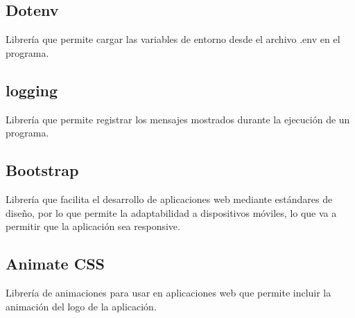 \subsection{Dotenv}
\cite{dotenv} Librería que permite cargar las variables de entorno desde el archivo .env en el programa.

\subsection{logging}
\cite{logging} Librería que permite registrar los mensajes mostrados durante la ejecución de un programa.


\subsection{Bootstrap}
\cite{bootstrap} Librería que facilita el desarrollo de aplicaciones web mediante estándares de diseño, por lo que permite la adaptabilidad a dispositivos móviles, lo que va a permitir que la aplicación sea responsive.

\subsection{Animate CSS}
Librería de animaciones para usar en aplicaciones web que permite incluir la animación del logo de la aplicación.